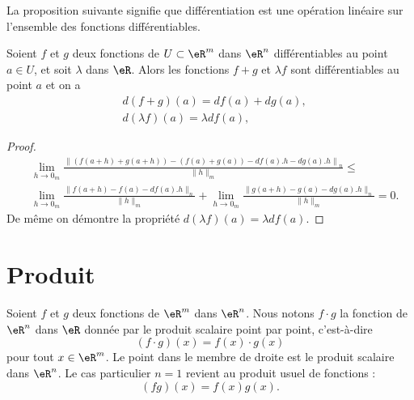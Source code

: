 La proposition suivante signifie que différentiation est une opération linéaire sur l'ensemble des fonctions différentiables.
\begin{proposition}		\label{PropDiffLineaire}
	Soient $f$ et $g$ deux fonctions de $U\subset\eR^m$ dans $\eR^n$ différentiables au point $a\in U$, et soit $\lambda$ dans $\eR$. Alors les fonctions $f+g$ et $\lambda f$ sont différentiables au point $a$ et on a
	\begin{equation}
		\begin{aligned}
			 & d(f+g)(a)=df(a)+dg(a),         \\
			 & d(\lambda f)(a)=\lambda df(a),
		\end{aligned}
	\end{equation}
\end{proposition}
\begin{proof}
	\begin{equation}
		\begin{aligned}
			 & \lim_{h\to 0_m}\frac{\left\|\left(f(a+h)+g(a+h)\right)-\left(f(a)+g(a)\right)-df(a).h-dg(a).h\right\|_n}{\|h\|_m}\leq \\
			 & \lim_{h\to 0_m}\frac{\|f(a+h)-f(a)-df(a).h\|_n}{\|h\|_m}+\lim_{h\to 0_m}\frac{\|g(a+h)-g(a)-dg(a).h\|_n}{\|h\|_m}=0.
		\end{aligned}
	\end{equation}
	De même on démontre la  propriété $d(\lambda f)(a)=\lambda df(a)$.
\end{proof}

\section{Produit}

Soient $f$ et $g$ deux fonctions de $\eR^m$ dans $\eR^n$. Nous notons $f\cdot g$ la fonction de $\eR^n$ dans $\eR$ donnée par le produit scalaire point par point, c'est-à-dire
\begin{equation}
	(f\cdot g)(x)=f(x)\cdot g(x)
\end{equation}
pour tout $x\in\eR^m$. Le point dans le membre de droite est le produit scalaire dans $\eR^n$. Le cas particulier $n=1$ revient au produit usuel de fonctions :
\begin{equation}
	(fg)(x)=f(x)g(x).
\end{equation}

